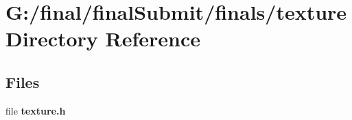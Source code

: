 \section{G\-:/final/final\-Submit/finals/texture Directory Reference}
\label{dir_5968abea91fee9d619541c2a769bfdec}
\subsection*{Files}
\begin{DoxyCompactItemize}
\item 
file {\bf texture.\-h}
\end{DoxyCompactItemize}
